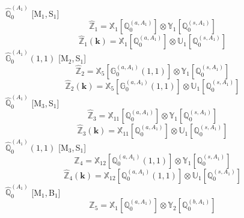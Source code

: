 \documentclass[fleqn,10pt,landscape]{article}
\begin{document}
\begin{itemize}
\vspace{4mm}
\noindent {} $\,\,\,\hat{\mathbb{Q}}_{0}^{(A_{1})}$ [M$_{1}$,\,S$_{1}$]
\begin{dmath*}
\hat{\mathbb{Z}}_{1}=\mathbb{X}_{1}[\mathbb{Q}_{0}^{(a,A_{1})}] \otimes\mathbb{Y}_{1}[\mathbb{Q}_{0}^{(s,A_{1})}]
\end{dmath*}
\begin{dmath*}
\hat{\mathbb{Z}}_{1}(\bm{k})=\mathbb{X}_{1}[\mathbb{Q}_{0}^{(a,A_{1})}] \otimes\mathbb{U}_{1}[\mathbb{Q}_{0}^{(s,A_{1})}]
\end{dmath*}
\vspace{4mm}
\noindent {} $\,\,\,\hat{\mathbb{G}}_{0}^{(A_{1})}(1,1)$ [M$_{2}$,\,S$_{1}$]
\begin{dmath*}
\hat{\mathbb{Z}}_{2}=\mathbb{X}_{5}[\mathbb{G}_{0}^{(a,A_{1})}(1,1)] \otimes\mathbb{Y}_{1}[\mathbb{Q}_{0}^{(s,A_{1})}]
\end{dmath*}
\begin{dmath*}
\hat{\mathbb{Z}}_{2}(\bm{k})=\mathbb{X}_{5}[\mathbb{G}_{0}^{(a,A_{1})}(1,1)] \otimes\mathbb{U}_{1}[\mathbb{Q}_{0}^{(s,A_{1})}]
\end{dmath*}
\vspace{4mm}
\noindent {} $\,\,\,\hat{\mathbb{Q}}_{0}^{(A_{1})}$ [M$_{3}$,\,S$_{1}$]
\begin{dmath*}
\hat{\mathbb{Z}}_{3}=\mathbb{X}_{11}[\mathbb{Q}_{0}^{(a,A_{1})}] \otimes\mathbb{Y}_{1}[\mathbb{Q}_{0}^{(s,A_{1})}]
\end{dmath*}
\begin{dmath*}
\hat{\mathbb{Z}}_{3}(\bm{k})=\mathbb{X}_{11}[\mathbb{Q}_{0}^{(a,A_{1})}] \otimes\mathbb{U}_{1}[\mathbb{Q}_{0}^{(s,A_{1})}]
\end{dmath*}
\vspace{4mm}
\noindent {} $\,\,\,\hat{\mathbb{Q}}_{0}^{(A_{1})}(1,1)$ [M$_{3}$,\,S$_{1}$]
\begin{dmath*}
\hat{\mathbb{Z}}_{4}=\mathbb{X}_{12}[\mathbb{Q}_{0}^{(a,A_{1})}(1,1)] \otimes\mathbb{Y}_{1}[\mathbb{Q}_{0}^{(s,A_{1})}]
\end{dmath*}
\begin{dmath*}
\hat{\mathbb{Z}}_{4}(\bm{k})=\mathbb{X}_{12}[\mathbb{Q}_{0}^{(a,A_{1})}(1,1)] \otimes\mathbb{U}_{1}[\mathbb{Q}_{0}^{(s,A_{1})}]
\end{dmath*}
\vspace{4mm}
\noindent {} $\,\,\,\hat{\mathbb{Q}}_{0}^{(A_{1})}$ [M$_{1}$,\,B$_{1}$]
\begin{dmath*}
\hat{\mathbb{Z}}_{5}=\mathbb{X}_{1}[\mathbb{Q}_{0}^{(a,A_{1})}] \otimes\mathbb{Y}_{2}[\mathbb{Q}_{0}^{(b,A_{1})}]

\end{dmath*}
\end{itemize}
\end{document}
